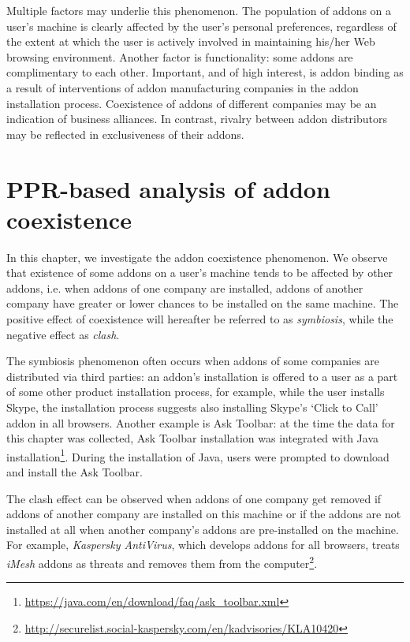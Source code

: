 \documentclass[ijoc,nonblindrev]{informs3} %
\numberwithin{equation}{subsection}
\begin{document}
Multiple factors may underlie this phenomenon. The population of addons on a user's machine is clearly affected by the user's personal preferences, regardless of the extent at which the user is actively involved in maintaining his/her Web browsing environment. Another factor is functionality: some addons are complimentary to each other. Important, and of high interest, is addon binding as a result of interventions of addon manufacturing companies in the addon installation process. Coexistence of addons of different companies may be an indication of business alliances. In contrast, rivalry between addon distributors may be reflected in exclusiveness of their addons. 

\section{PPR-based analysis of addon coexistence}
\label{chap:Symbiosis}

In this chapter, we investigate the addon coexistence phenomenon. We observe that existence of some addons on a user's machine tends to be affected by other addons, i.e. when addons of one company are installed, addons of another company have greater or lower chances to be installed on the same machine. The positive effect of coexistence will hereafter be referred to as \emph{symbiosis}, while the negative effect as \emph{clash}.

The symbiosis phenomenon often occurs when addons of some companies are distributed via third parties: an addon's installation is offered to a user as a part of some other product installation process, for example, while the user installs Skype, the installation process suggests also installing Skype's `Click to Call' addon in all browsers. Another example is Ask Toolbar: at the time the data for this chapter was collected, Ask Toolbar installation was integrated with Java installation\footnote{\url{https://java.com/en/download/faq/ask_toolbar.xml}}. During the installation of Java, users were prompted to download and install the Ask Toolbar.

The clash effect can be observed when addons of one company get removed if addons of another company are installed on this machine or if the addons are not installed at all when another company's addons are pre-installed on the machine. For example, \emph{Kaspersky AntiVirus}, which develops addons for all browsers, treats \emph{iMesh} addons as threats and removes them from the computer\footnote{\url{http://securelist.social-kaspersky.com/en/kadvisories/KLA10420}}.
\end{document}
